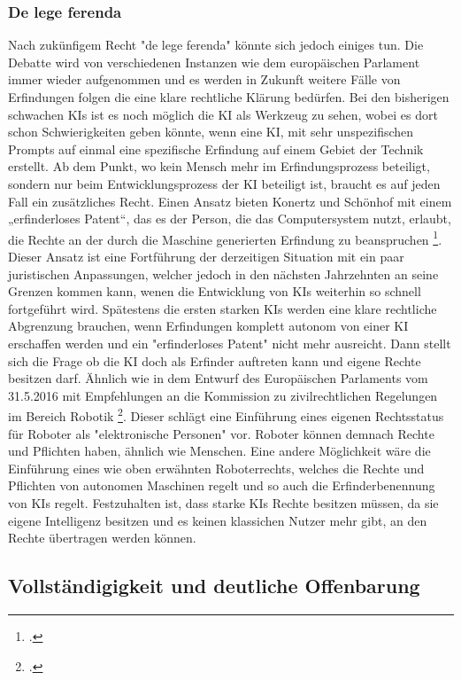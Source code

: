\subsubsection{De lege ferenda}
Nach zukünfigem Recht "de lege ferenda" könnte sich jedoch einiges tun.
Die Debatte wird von verschiedenen 
Instanzen wie dem europäischen Parlament immer wieder aufgenommen und es 
werden in Zukunft weitere Fälle von Erfindungen folgen die eine klare rechtliche 
Klärung bedürfen. 
Bei den bisherigen schwachen KIs ist es noch möglich die KI als Werkzeug
zu sehen, wobei es dort schon Schwierigkeiten geben könnte, wenn eine KI,
mit sehr unspezifischen Prompts auf einmal eine spezifische Erfindung auf
einem Gebiet der Technik erstellt.
Ab dem Punkt, wo kein Mensch mehr im Erfindungsprozess beteiligt,
sondern nur beim Entwicklungsprozess der KI beteiligt ist,
braucht es auf jeden Fall ein zusätzliches Recht.
Einen Ansatz bieten Konertz und Schönhof mit einem 
„erfinderloses Patent“, das es der Person, 
die das Computersystem nutzt, erlaubt, 
die Rechte an der durch die Maschine generierten Erfindung zu beanspruchen
\footcite{konertzErfindungenDurchComputer2018}. 
Dieser Ansatz ist eine Fortführung der derzeitigen Situation mit ein paar
juristischen Anpassungen, welcher jedoch in den nächsten Jahrzehnten 
an seine Grenzen kommen kann, wenen die Entwicklung von KIs weiterhin so schnell
fortgeführt wird.
Spätestens die ersten starken KIs werden eine klare rechtliche Abgrenzung 
brauchen, 
wenn Erfindungen komplett autonom 
von einer KI erschaffen werden und ein "erfinderloses Patent" 
nicht mehr ausreicht.
Dann stellt sich die Frage ob die KI doch als Erfinder auftreten kann 
und eigene Rechte besitzen darf. Ähnlich wie in dem Entwurf des Europäischen
Parlaments vom 31.5.2016 mit
Empfehlungen an die Kommission zu zivilrechtlichen Regelungen im
Bereich Robotik \footcite{delvauxMitEmpfehlungenKommission}. 
Dieser schlägt 
eine Einführung eines eigenen Rechtsstatus 
für Roboter als "elektronische Personen" vor.
Roboter können demnach Rechte und Pflichten haben, 
ähnlich wie Menschen.
Eine andere Möglichkeit wäre die Einführung eines wie oben 
erwähnten Roboterrechts, welches die Rechte und Pflichten von
autonomen Maschinen regelt und so auch die Erfinderbenennung
von KIs regelt. Festzuhalten ist, dass starke KIs Rechte
besitzen müssen, da sie eigene Intelligenz besitzen und
es keinen klassichen Nutzer mehr gibt, an den Rechte übertragen 
werden können.
\\
\subsection{Vollständigigkeit und deutliche Offenbarung}


